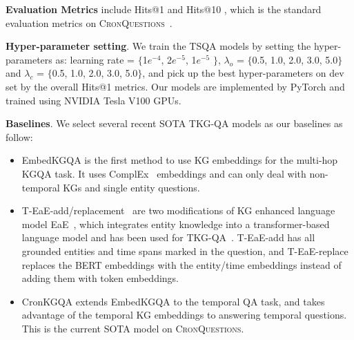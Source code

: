 \documentclass[11pt]{article}
\newcommand{\xhdr}[1]{{\noindent\bfseries #1}.}
\newcommand{\xhdrnd}[1]{{\noindent\bfseries #1}} %
\newcommand{\jing}[1]{{{\textcolor{red}{[jing: #1]}}}}
\begin{document}
\smallskip
\xhdrnd{Evaluation Metrics} include Hits@1 and Hits@10 , which is the standard evaluation metrics on \textsc{CronQuestions}~\cite{saxena2021question}.

\smallskip
\xhdr{Hyper-parameter setting} We train the TSQA models by setting the hyper-parameters as: learning rate = $\{$1$e^{-4}$, 2$e^{-5}$, 1$e^{-5}$ $\}$, $\lambda_{o}$ = $\{$0.5, 1.0, 2.0, 3.0, 5.0$\}$ and $\lambda_{c}$ = $\{$0.5, 1.0, 2.0, 3.0, 5.0$\}$, and pick up the best hyper-parameters on dev set %
by the overall Hits@1 metrics. 
Our models are implemented by PyTorch and trained using NVIDIA Tesla V100 GPUs.

\smallskip
\xhdr{Baselines} We select several recent SOTA TKG-QA models as our baselines as follow:
\begin{itemize}[leftmargin=*]
    \item  EmbedKGQA \cite{saxena2020improving} is the first method to use KG embeddings for the multi-hop KGQA task. It uses ComplEx~\cite{trouillon2016complex} embeddings and can only deal with non-temporal KGs and single entity questions.

    \item T-EaE-add/replacement~\cite{saxena2021question} are two modifications of KG enhanced language model EaE~\cite{fevry2020entities}, which integrates entity knowledge into a transformer-based language model and has been used for TKG-QA~\cite{saxena2020improving}. T-EaE-add has all grounded entities and time spans marked in the question, and T-EaE-replace replaces the BERT embeddings with the entity/time embeddings instead of adding them with token embeddings.
    
    \item CronKGQA \cite{saxena2021question} extends EmbedKGQA to the temporal QA task, and takes advantage of the temporal KG embeddings to answering temporal questions. This is the current SOTA model on \textsc{CronQuestions}.
\end{itemize}

\end{document}
